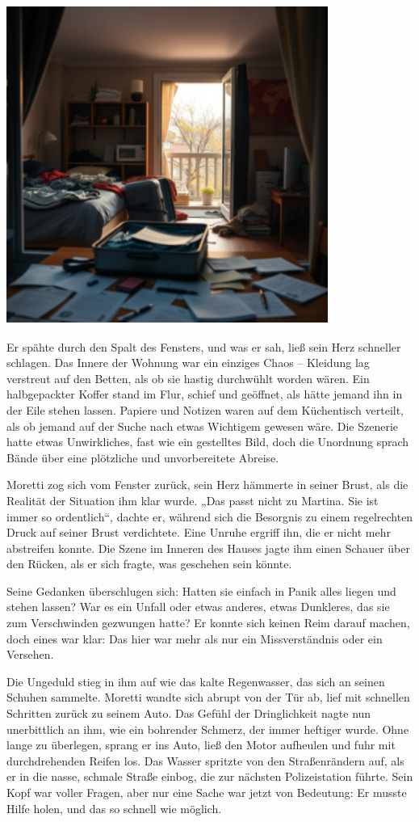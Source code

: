 \documentclass[
]{article}
\begin{document}
\includegraphics[width=4.14583in,height=4.11458in]{media/image003.png}

Er spähte durch den Spalt des Fensters, und was er sah, ließ sein Herz
schneller schlagen. Das Innere der Wohnung war ein einziges Chaos --
Kleidung lag verstreut auf den Betten, als ob sie hastig durchwühlt
worden wären. Ein halbgepackter Koffer stand im Flur, schief und
geöffnet, als hätte jemand ihn in der Eile stehen lassen. Papiere und
Notizen waren auf dem Küchentisch verteilt, als ob jemand auf der Suche
nach etwas Wichtigem gewesen wäre. Die Szenerie hatte etwas
Unwirkliches, fast wie ein gestelltes Bild, doch die Unordnung sprach
Bände über eine plötzliche und unvorbereitete Abreise.

Moretti zog sich vom Fenster zurück, sein Herz hämmerte in seiner Brust,
als die Realität der Situation ihm klar wurde. „Das passt nicht zu
Martina. Sie ist immer so ordentlich``, dachte er, während sich die
Besorgnis zu einem regelrechten Druck auf seiner Brust verdichtete. Eine
Unruhe ergriff ihn, die er nicht mehr abstreifen konnte. Die Szene im
Inneren des Hauses jagte ihm einen Schauer über den Rücken, als er sich
fragte, was geschehen sein könnte.

Seine Gedanken überschlugen sich: Hatten sie einfach in Panik alles
liegen und stehen lassen? War es ein Unfall oder etwas anderes, etwas
Dunkleres, das sie zum Verschwinden gezwungen hatte? Er konnte sich
keinen Reim darauf machen, doch eines war klar: Das hier war mehr als
nur ein Missverständnis oder ein Versehen.

Die Ungeduld stieg in ihm auf wie das kalte Regenwasser, das sich an
seinen Schuhen sammelte. Moretti wandte sich abrupt von der Tür ab, lief
mit schnellen Schritten zurück zu seinem Auto. Das Gefühl der
Dringlichkeit nagte nun unerbittlich an ihm, wie ein bohrender Schmerz,
der immer heftiger wurde. Ohne lange zu überlegen, sprang er ins Auto,
ließ den Motor aufheulen und fuhr mit durchdrehenden Reifen los. Das
Wasser spritzte von den Straßenrändern auf, als er in die nasse, schmale
Straße einbog, die zur nächsten Polizeistation führte. Sein Kopf war
voller Fragen, aber nur eine Sache war jetzt von Bedeutung: Er musste
Hilfe holen, und das so schnell wie möglich.
\end{document}
